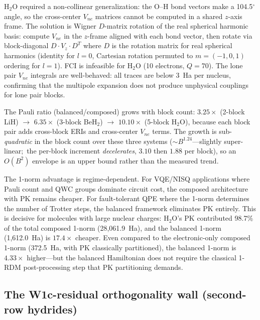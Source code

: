 \documentclass[aps,pra,twocolumn,superscriptaddress,longbibliography]{revtex4-2}
\begin{document}
H$_2$O required a non-collinear generalization: the O--H bond vectors
make a 104.5$^\circ$ angle, so the cross-center $V_{ne}$ matrices
cannot be computed in a shared $z$-axis frame.  The solution is Wigner
$D$-matrix rotation of the real spherical harmonic basis: compute
$V_{ne}$ in the $z$-frame aligned with each bond vector, then rotate
via block-diagonal $D \cdot V_z \cdot D^T$ where $D$ is the rotation
matrix for real spherical harmonics (identity for $l = 0$, Cartesian
rotation permuted to $m = (-1, 0, 1)$ ordering for $l = 1$).  FCI is
infeasible for H$_2$O (10 electrons, $Q = 70$).  The lone pair
$V_{ne}$ integrals are well-behaved: all traces are below 3~Ha per
nucleus, confirming that the multipole expansion does not produce
unphysical couplings for lone pair blocks.

The Pauli ratio (balanced/composed) grows with block count:
$3.25\times$ (2-block LiH) $\to$ $6.35\times$ (3-block BeH$_2$)
$\to$ $10.10\times$ (5-block H$_2$O), because each block pair adds
cross-block ERIs and cross-center $V_{ne}$ terms.  The growth is
sub-\emph{quadratic} in the block count over these three systems
($\sim B^{1.24}$---slightly super-linear;\ the per-block increment
\emph{decelerates}, $3.10$ then $1.88$ per block), so an $O(B^2)$ envelope
is an upper bound rather than the measured trend.

The 1-norm advantage is regime-dependent.  For VQE/NISQ applications
where Pauli count and QWC groups dominate circuit cost, the composed
architecture with PK remains cheaper.  For fault-tolerant QPE where
the 1-norm determines the number of Trotter steps, the balanced
framework eliminates PK entirely.  This is decisive for molecules
with large nuclear charges: H$_2$O's PK contributed 98.7\% of the
total composed 1-norm (28,061.9~Ha), and the balanced 1-norm
(1,612.0~Ha) is $17.4\times$ cheaper.  Even compared to the
electronic-only composed 1-norm (372.5~Ha, with PK classically
partitioned), the balanced 1-norm is $4.33\times$ higher---but the
balanced Hamiltonian does not require the classical 1-RDM post-processing
step that PK partitioning demands.


\subsection{The W1c-residual orthogonality wall (second-row hydrides)}
\label{sec:w1c_residual}
\end{document}
